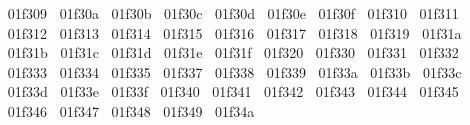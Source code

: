 {  ^^^^^^01f309%
  ^^^^^^01f30a%
  ^^^^^^01f30b%
  ^^^^^^01f30c%
  ^^^^^^01f30d%
  ^^^^^^01f30e%
  ^^^^^^01f30f%
  ^^^^^^01f310%
  ^^^^^^01f311%
  ^^^^^^01f312%
  ^^^^^^01f313%
  ^^^^^^01f314%
  ^^^^^^01f315%
  ^^^^^^01f316%
  ^^^^^^01f317%
  ^^^^^^01f318%
  ^^^^^^01f319%
  ^^^^^^01f31a%
  ^^^^^^01f31b%
  ^^^^^^01f31c%
  ^^^^^^01f31d%
  ^^^^^^01f31e%
  ^^^^^^01f31f%
  ^^^^^^01f320%
  ^^^^^^01f330%
  ^^^^^^01f331%
  ^^^^^^01f332%
  ^^^^^^01f333%
  ^^^^^^01f334%
  ^^^^^^01f335%
  ^^^^^^01f337%
  ^^^^^^01f338%
  ^^^^^^01f339%
  ^^^^^^01f33a%
  ^^^^^^01f33b%
  ^^^^^^01f33c%
  ^^^^^^01f33d%
  ^^^^^^01f33e%
  ^^^^^^01f33f%
  ^^^^^^01f340%
  ^^^^^^01f341%
  ^^^^^^01f342%
  ^^^^^^01f343%
  ^^^^^^01f344%
  ^^^^^^01f345%
  ^^^^^^01f346%
  ^^^^^^01f347%
  ^^^^^^01f348%
  ^^^^^^01f349%
  ^^^^^^01f34a%
}
